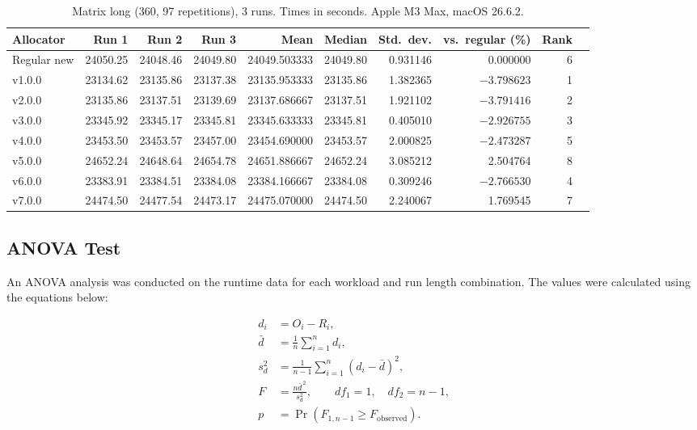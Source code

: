 \begin{table}[H]
\centering
\caption{Matrix long (360, 97 repetitions), 3 runs. Times in seconds. Apple M3 Max, macOS 26.6.2.}
\label{tab:matrix-long}
\footnotesize
\setlength{\tabcolsep}{4pt}
\begin{tabular}{@{}l rrr rrr rr r@{}}
\toprule
Allocator & Run 1 & Run 2 & Run 3 & Mean & Median & Std.\ dev. & vs.\ regular (\%) & Rank \\
\midrule
Regular new & 24050.25 & 24048.46 & 24049.80 & 24049.503333 & 24049.80 & 0.931146 & 0.000000 & 6 \\
v1.0.0 & 23134.62 & 23135.86 & 23137.38 & 23135.953333 & 23135.86 & 1.382365 & $-3.798623$ & 1 \\
v2.0.0 & 23135.86 & 23137.51 & 23139.69 & 23137.686667 & 23137.51 & 1.921102 & $-3.791416$ & 2 \\
v3.0.0 & 23345.92 & 23345.17 & 23345.81 & 23345.633333 & 23345.81 & 0.405010 & $-2.926755$ & 3 \\
v4.0.0 & 23453.50 & 23453.57 & 23457.00 & 23454.690000 & 23453.57 & 2.000825 & $-2.473287$ & 5 \\
v5.0.0 & 24652.24 & 24648.64 & 24654.78 & 24651.886667 & 24652.24 & 3.085212 & 2.504764 & 8 \\
v6.0.0 & 23383.91 & 23384.51 & 23384.08 & 23384.166667 & 23384.08 & 0.309246 & $-2.766530$ & 4 \\
v7.0.0 & 24474.50 & 24477.54 & 24473.17 & 24475.070000 & 24474.50 & 2.240067 & 1.769545 & 7 \\
\bottomrule
\end{tabular}
\end{table}

\subsection{ANOVA Test}
An ANOVA analysis was conducted on the runtime data for each workload and run length combination. The values were calculated using the equations below:

\begin{align}
d_i &= O_i-R_i, \\
\bar d &= \frac{1}{n}\sum_{i=1}^{n}d_i, \\
s_d^2 &= \frac{1}{n-1}\sum_{i=1}^{n}(d_i-\bar d)^2, \\
F &= \frac{n\bar d^{\,2}}{s_d^2},
\qquad df_1=1,\quad df_2=n-1, \\
p &= \Pr\!\left(F_{1,n-1}\ge F_{\mathrm{observed}}\right).
\end{align}

